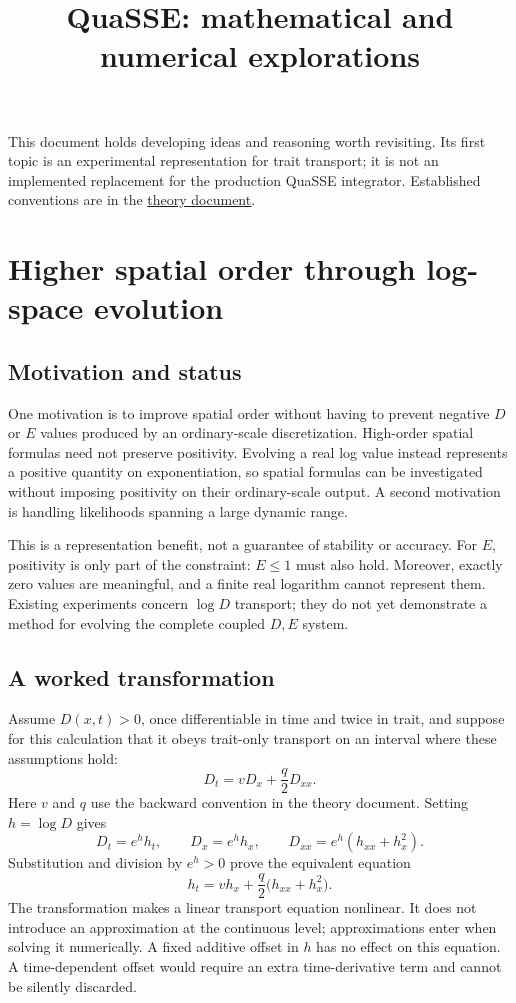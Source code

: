 \documentclass[11pt]{article}
\title{QuaSSE: mathematical and numerical explorations}
\begin{document}
\maketitle

This document holds developing ideas and reasoning worth revisiting. Its first topic is an
experimental representation for trait transport; it is not an implemented replacement for the
production QuaSSE integrator. Established conventions are in the \href{theory.pdf}{theory document}.

\section{Higher spatial order through log-space evolution}\label{sec:log-space}
\subsection{Motivation and status}
One motivation is to improve spatial order without having to prevent negative $D$ or $E$ values
produced by an ordinary-scale discretization. High-order spatial formulas need not preserve
positivity. Evolving a real log value instead represents a positive quantity on exponentiation,
so spatial formulas can be investigated without imposing positivity on their ordinary-scale output.
A second motivation is handling likelihoods spanning a large dynamic range.

This is a representation benefit, not a guarantee of stability or accuracy. For $E$, positivity is
only part of the constraint: $E\leq1$ must also hold. Moreover, exactly zero values are meaningful,
and a finite real logarithm cannot represent them. Existing experiments concern $\log D$ transport;
they do not yet demonstrate a method for evolving the complete coupled $D,E$ system.

\subsection{A worked transformation}
Assume $D(x,t)>0$, once differentiable in time and twice in trait, and suppose for this calculation
that it obeys trait-only transport on an interval where these assumptions hold:
\begin{equation}\label{eq:D-transport}
 D_t=vD_x+\frac q2 D_{xx}.
\end{equation}
Here $v$ and $q$ use the backward convention in the theory document. Setting $h=\log D$ gives
\begin{equation}\label{eq:log-identities}
 D_t=e^h h_t,\qquad D_x=e^h h_x,\qquad
 D_{xx}=e^h(h_{xx}+h_x^2).
\end{equation}
Substitution and division by $e^h>0$ prove the equivalent equation
\begin{equation}\label{eq:log-transport}
 h_t=v h_x+\frac q2\bigl(h_{xx}+h_x^2\bigr).
\end{equation}
The transformation makes a linear transport equation nonlinear. It does not introduce an
approximation at the continuous level; approximations enter when solving it numerically.
A fixed additive offset in $h$ has no effect on this equation. A time-dependent offset would require
an extra time-derivative term and cannot be silently discarded.
\end{document}
